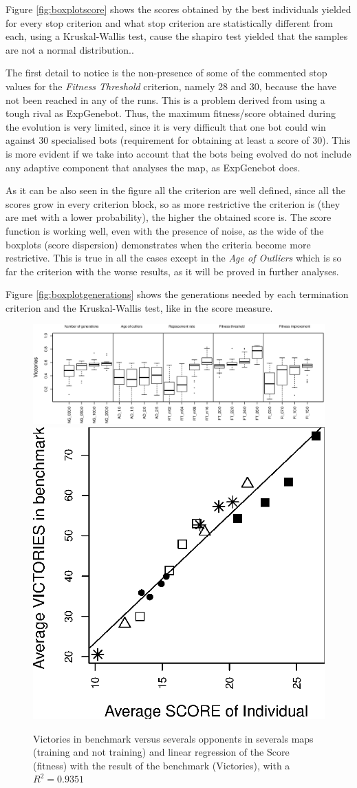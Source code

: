 \documentclass[runningheads,a4paper]{llncs}
\begin{document}
Figure \ref{fig:boxplotscore} shows the scores obtained by the best individuals yielded for every stop criterion and what stop criterion are statistically different from each, using a Kruskal-Wallis test, cause the shapiro test yielded that the samples are not a normal distribution.. 

The first detail to notice is the non-presence of some of the commented stop values for the \textit{Fitness Threshold} criterion, namely 28 and 30, because the have not been reached in any of the runs.
This is a problem derived from using a tough rival as ExpGenebot. Thus, the maximum fitness/score obtained during the evolution is very limited, since it is very difficult that one bot could win against 30 specialised bots \cite{Wolpert97nofree} (requirement for obtaining at least a score of 30). This is more evident if we take into account that the bots being evolved do not include any adaptive component that analyses the map, as ExpGenebot does. 

As it can be also seen in the figure all the criterion are well defined, since all the scores grow in every criterion block, so as more restrictive  the criterion is (they are met with a lower probability), the higher the obtained score is. The score function is working well, even with the presence of noise, as the wide of the boxplots (score dispersion) demonstrates when the criteria become more restrictive. This is true in all the cases except in the \textit{Age of Outliers} which is so far the criterion with the worse results, as it will be proved in further analyses.

Figure \ref{fig:boxplotgenerations} shows the generations needed by each termination criterion and the Kruskal-Wallis test, like in the score measure.

\begin{figure}[h!tb]
\begin{center}
\includegraphics[width=0.75\columnwidth]{imags/victories.eps}
\includegraphics[width=0.24\columnwidth]{imags/score-victories.eps}
\end{center} 
\caption{Victories in benchmark versus severals opponents in severals maps (training and not training) and linear regression of the Score (fitness) with the result of the benchmark (Victories), with a $R^2=0.9351$ } %
\label{fig:victories}
\end{figure}
\end{document}
